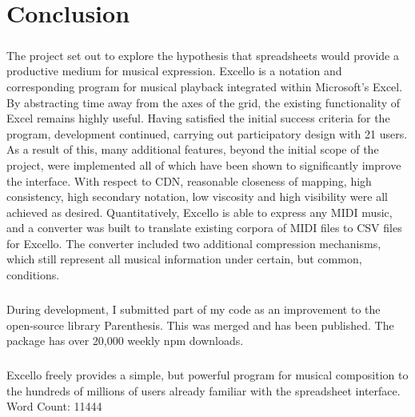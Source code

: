 
\chapter{Conclusion}

\paragraph{} The project set out to explore the hypothesis that spreadsheets would provide a productive medium for musical expression. Excello is a notation and corresponding program for musical playback integrated within Microsoft's Excel. By abstracting time away from the axes of the grid, the existing functionality of Excel remains highly useful. Having satisfied the initial success criteria for the program, development continued, carrying out participatory design with 21 users. As a result of this, many additional features, beyond the initial scope of the project, were implemented all of which have been shown to significantly improve the interface. With respect to CDN, reasonable closeness of mapping, high consistency, high secondary notation, low viscosity and high visibility were all achieved as desired. Quantitatively, Excello is able to express any  MIDI music, and a converter was built to translate existing corpora of MIDI files to CSV files for Excello. The converter included two additional compression mechanisms, which still represent all musical information under certain, but common, conditions.

\paragraph{} During development, I submitted part of my code as an improvement to the open-source library Parenthesis. This was merged and has been published. The package has over 20,000 weekly npm downloads.

\paragraph{} Excello freely provides a simple, but powerful program for musical composition to the hundreds of millions of users already familiar with the spreadsheet interface. \\

Word Count: 11444

